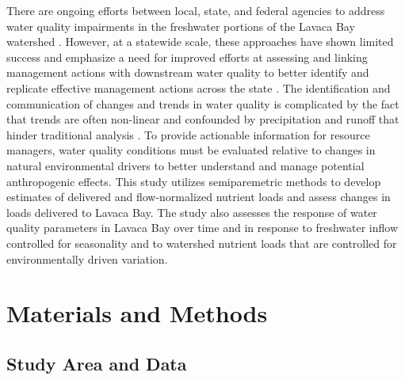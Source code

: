 \documentclass[water,article,submit,oneauthor]{Definitions/mdpi}
\begin{document}
There are ongoing efforts between local, state, and federal agencies to
address water quality impairments in the freshwater portions of the
Lavaca Bay watershed
\citep{jainTechnicalSupportDocument2021, schramm_lavaca_2018, bertholdDirectMailingEducation2021}.
However, at a statewide scale, these approaches have shown limited
success and emphasize a need for improved efforts at assessing and
linking management actions with downstream water quality to better
identify and replicate effective management actions across the state
\citep{schrammTotalMaximumDaily2022}. The identification and
communication of changes and trends in water quality is complicated by
the fact that trends are often non-linear and confounded by
precipitation and runoff that hinder traditional analysis
\citep{wazniakLinkingWaterQuality2007, lloydMethodsDetectingChange2014}.
To provide actionable information for resource managers, water quality
conditions must be evaluated relative to changes in natural
environmental drivers to better understand and manage potential
anthropogenic effects. This study utilizes semiparemetric methods to
develop estimates of delivered and flow-normalized nutrient loads and
assess changes in loads delivered to Lavaca Bay. The study also assesses
the response of water quality parameters in Lavaca Bay over time and in
response to freshwater inflow controlled for seasonality and to
watershed nutrient loads that are controlled for environmentally driven
variation.

\hypertarget{materials-and-methods}{%
\section{Materials and Methods}\label{materials-and-methods}}

\hypertarget{study-area-and-data}{%
\subsection{Study Area and Data}\label{study-area-and-data}}
\end{document}
